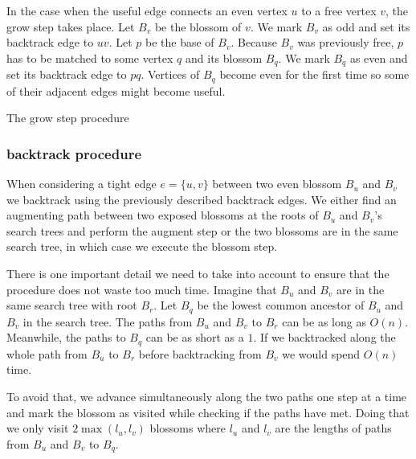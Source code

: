 In the case when the useful edge connects an even vertex $u$ to a free vertex $v$, the grow step takes place. Let $B_v$ be the blossom of $v$. We mark $B_v$ as odd and set its backtrack edge to $uv$. Let $p$ be the base of $B_v$. Because $B_v$ was previously free, $p$ has to be matched to some vertex $q$ and its blossom $B_q$. We mark $B_q$ as even and set its backtrack edge to $pq$. Vertices of $B_q$ become even for the first time so some of their adjacent edges might become useful.

\begin{algorithm}
\caption{The grow step procedure}\label{alg:grow_step}
\begin{algorithmic}[1]
\EndProcedure
\end{algorithmic}
\end{algorithm}

\subsubsection*{backtrack procedure}

When considering a tight edge $e=\{u, v\}$ between two even blossom $B_u$ and $B_v$ we backtrack using the previously described backtrack edges. We either find an augmenting path between two exposed blossoms at the roots of $B_u$ and $B_v$'s search trees and perform the augment step or the two blossoms are in the same search tree, in which case we execute the blossom step. 

There is one important detail we need to take into account to ensure that the procedure does not waste too much time. Imagine that $B_u$ and $B_v$ are in the same search tree with root $B_r$. Let $B_q$ be the lowest common ancestor of $B_u$ and $B_v$ in the search tree. The paths from $B_u$ and $B_v$ to $B_r$ can be as long as $O(n)$. Meanwhile, the paths to $B_q$ can be as short as a $1$. If we backtracked along the whole path from $B_u$ to $B_r$ before backtracking from $B_v$ we would spend $O(n)$ time. 

To avoid that, we advance simultaneously along the two paths one step at a time and mark the blossom as visited while checking if the paths have met. Doing that we only visit $2\max(l_u, l_v)$ blossoms where $l_u$ and $l_v$ are the lengths of paths from $B_u$ and $B_v$ to $B_q$.

